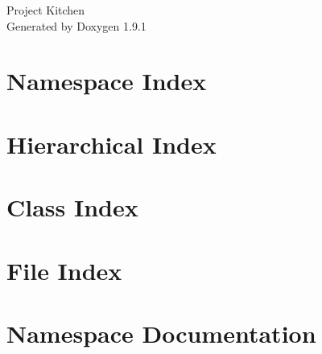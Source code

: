 \let\mypdfximage\pdfximage\def\pdfximage{\immediate\mypdfximage}\documentclass[twoside]{book}
\newcommand{\+}{\discretionary{\mbox{\scriptsize$\hookleftarrow$}}{}{}}
\newcommand{\clearemptydoublepage}{%
  \newpage{\pagestyle{empty}\cleardoublepage}%
}
\begin{document}
\raggedbottom

\hypersetup{pageanchor=false,
             bookmarksnumbered=true,
             pdfencoding=unicode
            }
\begin{titlepage}
\vspace*{7cm}
\begin{center}%
{\Large Project Kitchen }\\
\vspace*{1cm}
{\large Generated by Doxygen 1.9.1}\\
\end{center}
\end{titlepage}
\clearemptydoublepage
{}
\tableofcontents
\clearemptydoublepage
{}
\hypersetup{pageanchor=true}

\chapter{Namespace Index}

\chapter{Hierarchical Index}

\chapter{Class Index}

\chapter{File Index}

\chapter{Namespace Documentation}


















\end{document}
